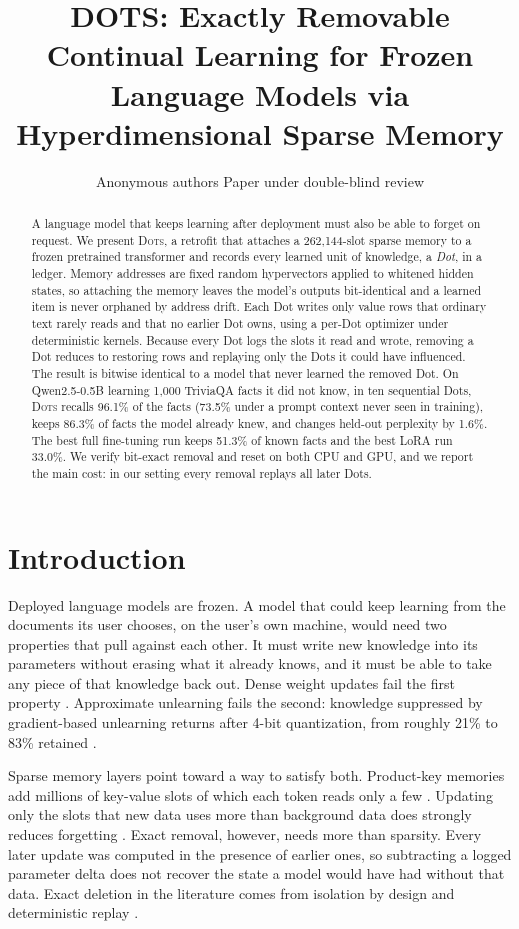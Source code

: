 \documentclass[10pt]{article}
\title{DOTS: Exactly Removable Continual Learning for Frozen Language Models via Hyperdimensional Sparse Memory}
\author{\name Anonymous authors \email Paper under double-blind review}
\newcommand{\sys}{\textsc{Dots}}
\begin{document}
\maketitle
\begin{abstract}
A language model that keeps learning after deployment must also be able to forget on request. We present \sys{}, a retrofit that attaches a 262{,}144-slot sparse memory to a frozen pretrained transformer and records every learned unit of knowledge, a \emph{Dot}, in a ledger. Memory addresses are fixed random hypervectors applied to whitened hidden states, so attaching the memory leaves the model's outputs bit-identical and a learned item is never orphaned by address drift. Each Dot writes only value rows that ordinary text rarely reads and that no earlier Dot owns, using a per-Dot optimizer under deterministic kernels. Because every Dot logs the slots it read and wrote, removing a Dot reduces to restoring rows and replaying only the Dots it could have influenced. The result is bitwise identical to a model that never learned the removed Dot. On Qwen2.5-0.5B learning 1{,}000 TriviaQA facts it did not know, in ten sequential Dots, \sys{} recalls 96.1\% of the facts (73.5\% under a prompt context never seen in training), keeps 86.3\% of facts the model already knew, and changes held-out perplexity by 1.6\%. The best full fine-tuning run keeps 51.3\% of known facts and the best LoRA run 33.0\%. We verify bit-exact removal and reset on both CPU and GPU, and we report the main cost: in our setting every removal replays all later Dots.
\end{abstract}


\section{Introduction}

Deployed language models are frozen. A model that could keep learning from the documents its user chooses, on the user's own machine, would need two properties that pull against each other. It must write new knowledge into its parameters without erasing what it already knows, and it must be able to take any piece of that knowledge back out. Dense weight updates fail the first property \citep{mccloskey1989,kirkpatrick2017ewc,ibrahim2024simple}. Approximate unlearning fails the second: knowledge suppressed by gradient-based unlearning returns after 4-bit quantization, from roughly 21\% to 83\% retained \citep{zhang2025quant}.

Sparse memory layers point toward a way to satisfy both. Product-key memories add millions of key-value slots of which each token reads only a few \citep{lample2019pkm,berges2024memory}. Updating only the slots that new data uses more than background data does strongly reduces forgetting \citep{lin2025smf,goyal2026improving,gupta2026smf}. Exact removal, however, needs more than sparsity. Every later update was computed in the presence of earlier ones, so subtracting a logged parameter delta does not recover the state a model would have had without that data. Exact deletion in the literature comes from isolation by design and deterministic replay \citep{bourtoule2021sisa,x2025trace,kuo2025sift}.
\end{document}
